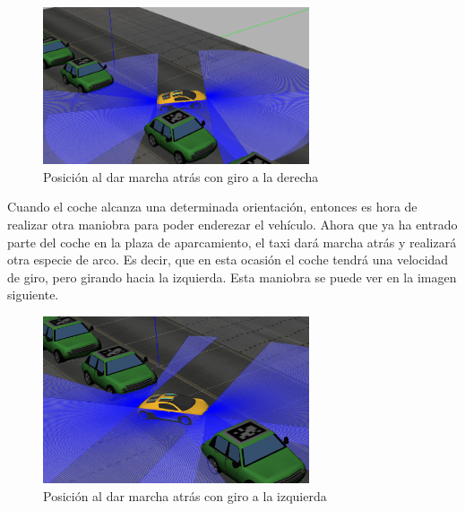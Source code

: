 \begin{figure}[H]
  \begin{center}
    \includegraphics[width=0.7\textwidth]{figures/Autopark/Posicion3.png}
		\caption{Posición al dar marcha atrás con giro a la derecha}
		\label{fig.Posicion3}
		\end{center}
\end{figure}

Cuando el coche alcanza una determinada orientación, entonces es hora de realizar otra maniobra para poder enderezar el vehículo. Ahora que ya ha entrado parte del coche en la plaza de aparcamiento, el taxi dará marcha atrás y realizará otra especie de arco. Es decir, que en esta ocasión el coche tendrá una velocidad de giro, pero girando hacia la izquierda. Esta maniobra se puede ver en la imagen siguiente.

\begin{figure}[H]
  \begin{center}
    \includegraphics[width=0.7\textwidth]{figures/Autopark/Posicion4.png}
		\caption{Posición al dar marcha atrás con giro a la izquierda}
		\label{fig.Posicion4}
		\end{center}
\end{figure}

